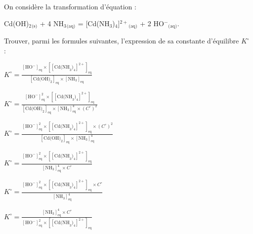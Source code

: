 \debutEntrainement


\begin{enonce}
	On considère la transformation d'équation : 
	\begin{center}
	{Cd(OH)$_2$}$_\text{(s)}$ + 4 {NH$_3$}$_\text{(aq)}$ = {[Cd(NH$_3$)$_4$]$^{2+}$}$_\text{(aq)}$ + 2 {HO$^-$}$_\text{(aq)}$.
	\end{center}
	Trouver, parmi les formules suivantes, l'expression de sa constante d'équilibre $K^\circ$ :
	
	\medskip
	
	\begin{listeQCM2Colonnes}
	\item $K^\circ=\frac{\left[\text{HO}^-\right]_\text{eq}\times\left[[\text{Cd(NH}_3)_4]^{2+}\right]_\text{eq}}{\left[\text{Cd(OH)}_2\right]_\text{eq}\times\left[\text{NH}_3\right]_\text{eq}}$\bigskip
	\item $K^\circ=\frac{\left[\text{HO}^-\right]^2_\text{eq}\times\left[[\text{Cd(NH}_3)_4]^{2+}\right]_\text{eq}}{\left[\text{Cd(OH)}_2\right]_\text{eq}\times\left[\text{NH}_3\right]^4_\text{eq}\times (C^\circ)^2}$\bigskip
	\item $K^\circ=\frac{\left[\text{HO}^-\right]^2_\text{eq}\times\left[[\text{Cd(NH}_3)_4]^{2+}\right]_\text{eq}\times (C^\circ)^2}{\left[\text{Cd(OH)}_2\right]_\text{eq}\times\left[\text{NH}_3\right]^4_\text{eq}}$\columnbreak
	\item $K^\circ=\frac{\left[\text{HO}^-\right]^2_\text{eq}\times\left[[\text{Cd(NH}_3)_4]^{2+}\right]_\text{eq}}{\left[\text{NH}_3\right]^4_\text{eq}\times C^\circ}$\bigskip
	\item $K^\circ=\frac{\left[\text{HO}^-\right]^2_\text{eq}\times\left[[\text{Cd(NH}_3)_4]^{2+}\right]_\text{eq}\times C^\circ}{\left[\text{NH}_3\right]^4_\text{eq}}$\bigskip
	\item $K^\circ=\frac{\left[\text{NH}_3\right]^4_\text{eq}\times C^\circ}{\left[\text{HO}^-\right]^2_\text{eq}\times\left[[\text{Cd(NH}_3)_4]^{2+}\right]_\text{eq}}$
	\end{listeQCM2Colonnes}

\bigskip

\end{enonce}

\reponse{\reponseE{}}

